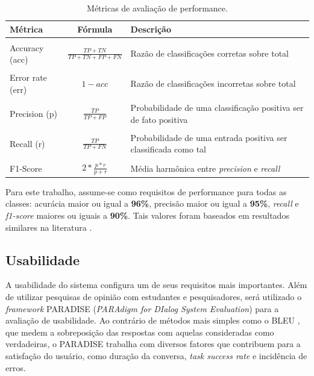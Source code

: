 \documentclass[]{politex}
\begin{document}
\begin{table}[h!]
  \begin{center}
    \begin{tabular}{l|c|p{8cm}}
      \textbf{Métrica} & \textbf{Fórmula} & \textbf{Descrição}\\
      \hline
       & & \\
      Accuracy (acc) & $\frac{TP+TN}{TP+TN+FP+FN}$ & Razão de classificações corretas sobre total \\
       & & \\
      Error rate (err) & $1-acc$ & Razão de classificações incorretas sobre total\\
       & & \\
      Precision (p) & $\frac{TP}{TP+FP}$ & Probabilidade de uma classificação positiva ser de fato positiva\\
       & & \\
      Recall (r) & $\frac{TP}{TP+FN}$ & Probabilidade de uma entrada positiva ser classificada como tal\\
       & & \\
      F1-Score & $2*\frac{p*r}{p+r}$ & Média harmônica entre \textit{precision} e \textit{recall}\\
    \end{tabular}
    \caption{Métricas de avaliação de performance.}
    \label{tab:table1}
  \end{center}
\end{table}

Para este trabalho, assume-se como requisitos de performance para todas as classes: acurácia maior ou igual a \textbf{96\%}, precisão maior ou igual a \textbf{95\%}, \textit{recall} e \textit{f1-score} maiores ou iguais a \textbf{90\%}. Tais valores foram baseados em resultados similares na literatura \cite{Correa-et-al-2018}.

\subsection{Usabilidade}

A usabilidade do sistema configura um de seus requisitos mais importantes. Além de utilizar pesquisas de opinião com estudantes e pesquisadores, será utilizado o \textit{framework} PARADISE (\textit{PARAdigm for DIalog System Evaluation}) \cite{Walker:1997:PFE:979617.979652} para a avaliação de usabilidade. Ao contrário de métodos mais simples como o BLEU \cite{Papineni02bleu:a}, que medem a sobreposição das respostas com aquelas consideradas como verdadeiras, o PARADISE trabalha com diversos fatores que contribuem para a satisfação do usuário, como duração da conversa, \textit{task success rate} e incidência de erros. 
\end{document}

